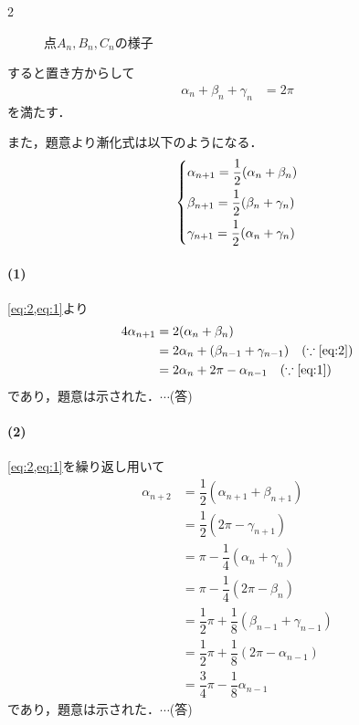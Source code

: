 \documentclass[../../main.tex]{subfiles}
\begin{document}
\begin{multicols}{2}
\begin{figure}[H]
\begin{tikzpicture}
    \end{tikzpicture}
    \caption{点$A_n,B_n,C_n$の様子}
    \label{1995-2:fig:1}
  \end{figure}

  すると置き方からして
  \begin{align}
    \alpha_n + \beta_n + \gamma_n & = 2\pi \label{eq:1}
  \end{align}
  を満たす．

  また，題意より漸化式は以下のようになる．
  \begin{align}
    \begin{dcases}
      \alpha_{n+1} = \dfrac{1}{2}(\alpha_n + \beta_n) \\
      \beta_{n+1} = \dfrac{1}{2}(\beta_n + \gamma_n)  \\
      \gamma_{n+1} = \dfrac{1}{2}(\alpha_n + \gamma_n)
    \end{dcases} \label{eq:2}
  \end{align}

  \paragraph{(1)}
  \cref{eq:2,eq:1}より
  \begin{align}
    4\alpha_{n+1}
    & = 2(\alpha_n + \beta_n)                                                               \\
    & = 2\alpha_n + (\beta_{n-1} + \gamma_{n-1}) \quad (\because \text{\cref{eq:2}}) \\
    & = 2\alpha_n + 2\pi - \alpha_{n-1} \quad (\because \text{\cref{eq:1}})
  \end{align}
  であり，題意は示された．$\cdots$(答)

  \paragraph{(2)}
  \cref{eq:2,eq:1}を繰り返し用いて
  \begin{align}
    \alpha_{n+2}
    & = \dfrac{1}{2}(\alpha_{n+1} +\beta_{n+1} )                 \\
    & = \dfrac{1}{2}(2\pi - \gamma_{n+1})                        \\
    & = \pi - \dfrac{1}{4}(\alpha_n + \gamma_n)                  \\
    & = \pi - \dfrac{1}{4}(2\pi - \beta_{n})                     \\
    & = \dfrac{1}{2}\pi + \dfrac{1}{8}(\beta_{n-1} +\gamma_{n-1}) \\
    & = \dfrac{1}{2}\pi + \dfrac{1}{8}(2\pi - \alpha_{n-1})       \\
    & = \dfrac{3}{4}\pi - \dfrac{1}{8}\alpha_{n-1}
  \end{align}
  であり，題意は示された．$\cdots$(答)


\end{multicols}
\end{document}
